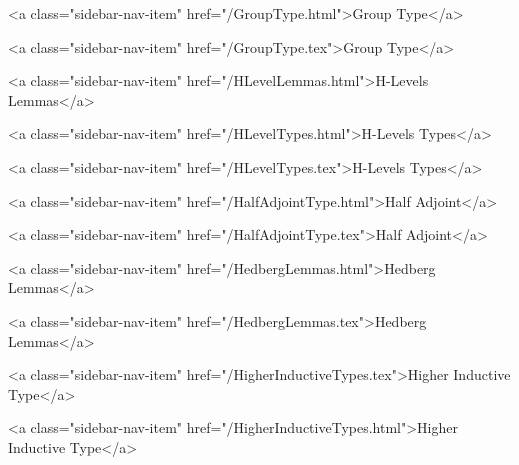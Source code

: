       
        
          <a class="sidebar-nav-item" href="/GroupType.html">Group Type</a>
        
      
    
      
        
          <a class="sidebar-nav-item" href="/GroupType.tex">Group Type</a>
        
      
    
      
        
          <a class="sidebar-nav-item" href="/HLevelLemmas.html">H-Levels Lemmas</a>
        
      
    
      
        
          <a class="sidebar-nav-item" href="/HLevelTypes.html">H-Levels Types</a>
        
      
    
      
        
          <a class="sidebar-nav-item" href="/HLevelTypes.tex">H-Levels Types</a>
        
      
    
      
        
          <a class="sidebar-nav-item" href="/HalfAdjointType.html">Half Adjoint</a>
        
      
    
      
        
          <a class="sidebar-nav-item" href="/HalfAdjointType.tex">Half Adjoint</a>
        
      
    
      
        
          <a class="sidebar-nav-item" href="/HedbergLemmas.html">Hedberg Lemmas</a>
        
      
    
      
        
          <a class="sidebar-nav-item" href="/HedbergLemmas.tex">Hedberg Lemmas</a>
        
      
    
      
        
          <a class="sidebar-nav-item" href="/HigherInductiveTypes.tex">Higher Inductive Type</a>
        
      
    
      
        
          <a class="sidebar-nav-item" href="/HigherInductiveTypes.html">Higher Inductive Type</a>
        
